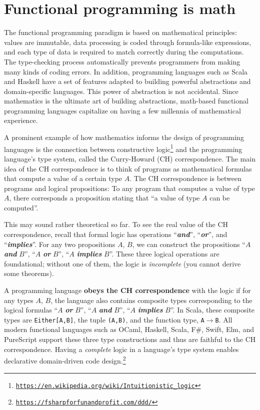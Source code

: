 \section{Functional programming is math}

The functional programming paradigm is based on mathematical principles:
values are immutable, data processing is coded through formula-like
expressions, and each type of data is required to match correctly
during the computations. The type-checking process automatically prevents
programmers from making many kinds of coding errors. In addition,
programming languages such as Scala and Haskell have a set of features
adapted to building powerful abstractions and domain-specific languages.
This power of abstraction is not accidental. Since mathematics is
the ultimate art of building abstractions, math-based functional programming
languages capitalize on having a few millennia of mathematical experience.

A prominent example of how mathematics informs the design of programming
languages is the connection between constructive logic\footnote{\texttt{\href{https://en.wikipedia.org/wiki/Intuitionistic_logic}{https://en.wikipedia.org/wiki/Intuitionistic\_logic}}}
and the programming language\textsf{'}s type system, called the Curry-Howard
(CH) correspondence. The main idea of the CH correspondence
is to think of programs as mathematical formulas that compute a value
of a certain type $A$. The CH correspondence is between programs
and logical propositions: To any program that computes a value of
type $A$, there corresponds a proposition stating that \textsf{``}a value
of type $A$ can be computed\textsf{''}.

This may sound rather theoretical so far. To see the real value of
the CH correspondence, recall that formal logic has operations \textsf{``}\textbf{\emph{and}}\textsf{''},
\textsf{``}\textbf{\emph{or}}\textsf{''}, and \textsf{``}\textbf{\emph{implies}}\textsf{''}. For any
two propositions $A$, $B$, we can construct the propositions \textsf{``}$A$
\textbf{\emph{and}} $B$\textsf{''}, \textsf{``}$A$ \textbf{\emph{or}} $B$\textsf{''}, \textsf{``}$A$
\textbf{\emph{implies}} $B$\textsf{''}. These three logical operations are
foundational; without one of them, the logic is \emph{incomplete}
(you cannot derive some theorems).

A programming language \textbf{obeys the CH correspondence}
with the logic if for any types $A$, $B$, the language also contains
composite types corresponding to the logical formulas \textsf{``}$A$ \textbf{\emph{or}}
$B$\textsf{''}, \textsf{``}$A$ \textbf{\emph{and}} $B$\textsf{''}, \textsf{``}$A$ \textbf{\emph{implies}}
$B$\textsf{''}. In Scala, these composite types are \texttt{Either{[}A,B{]}},
the tuple \texttt{(A,B)}, and the function type, \texttt{A$\rightarrow$B}.
All modern functional languages such as OCaml, Haskell, Scala, F\#,
Swift, Elm, and PureScript support these three type constructions
and thus are faithful to the CH correspondence. Having a \emph{complete}
logic in a language\textsf{'}s type system enables declarative domain-driven
code design.\footnote{\texttt{\href{https://fsharpforfunandprofit.com/ddd/}{https://fsharpforfunandprofit.com/ddd/}}}


